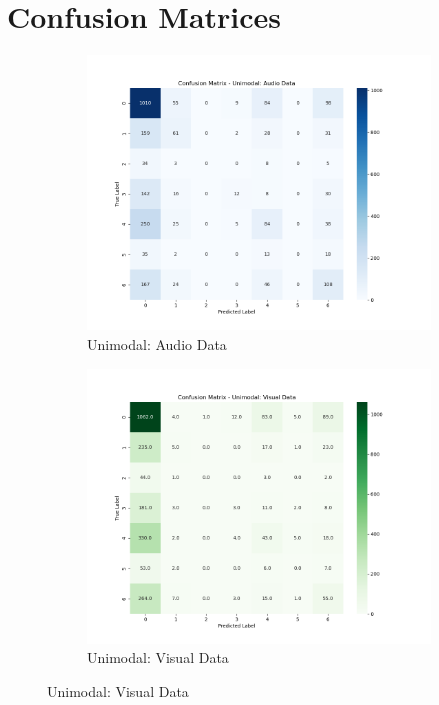 \section{Confusion Matrices}
\begin{figure}[htbp]
    \centering
    \begin{subfigure}[b]{0.45\textwidth}
        \centering
        \includegraphics[width=\textwidth]{figures/audio.png}
        \caption{Unimodal: Audio Data}
    \end{subfigure}
    \hfill
    \begin{subfigure}[b]{0.45\textwidth}
        \centering
        \includegraphics[width=\textwidth]{figures/visual.png}
        \caption{Unimodal: Visual Data}
    \end{subfigure}


\end{figure}

